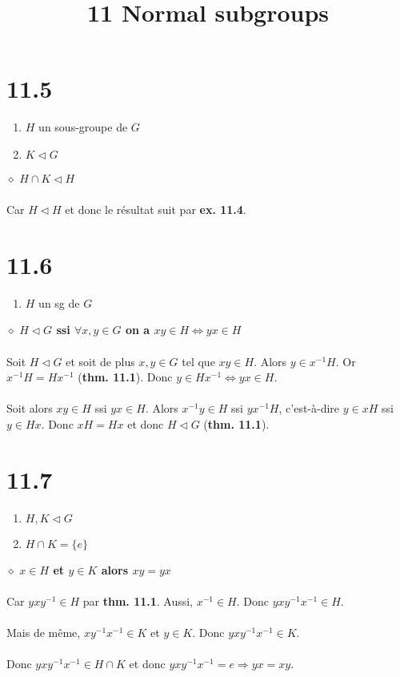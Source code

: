 \documentclass[a4paper,10pt]{article}
\title{11 Normal subgroups}
\begin{document}
\maketitle

\section*{11.5}
\begin{enumerate}
  \item $H$ un sous-groupe de $G$ 
  \item $K \triangleleft G$
\end{enumerate}
$\diamond$ $H \cap K \triangleleft H$
\\
\\
Car $H \triangleleft H$ et donc le résultat suit par \textbf{ex. 11.4}.

\section*{11.6}
\begin{enumerate}
	\item $H$ un sg de $G$
\end{enumerate}
$\diamond$ \textbf{$H \triangleleft G$ ssi $\forall x,y \in G$ on a $xy \in H \Leftrightarrow yx \in H$}
\\
\\
Soit $H \triangleleft G$ et soit de plus $x,y \in G$ tel que $xy \in H$. Alors $y \in x^{-1}H$. Or $x^{-1}H = Hx^{-1}$ (\textbf{thm. 11.1}). Donc $y \in Hx^{-1} \Leftrightarrow yx \in H$.
\\
\\
Soit alors $xy \in H$ ssi $yx \in H$. Alors $x^{-1}y \in H$ ssi $yx^{-1}H$, c'est-à-dire $y \in xH$ ssi $y \in Hx$. Donc $xH = Hx$ et donc $H \triangleleft G$ (\textbf{thm. 11.1}).

\section*{11.7}
\begin{enumerate}
	\item $H,K \triangleleft G$
	\item $H \cap K = \{e\}$
\end{enumerate}
$\diamond$ \textbf{$x \in H$ et $y \in K$ alors $xy = yx$}
\\
\\
Car $yxy^{-1} \in H$ par \textbf{thm. 11.1}. Aussi, $x^{-1} \in H$. Donc $yxy^{-1}x^{-1} \in H$. 
\\
\\
Mais de même, $xy^{-1}x^{-1} \in K$ et $y \in K$. Donc $yxy^{-1}x^{-1} \in K$. 
\\
\\
Donc $yxy^{-1}x^{-1} \in H \cap K$ et donc $yxy^{-1}x^{-1} = e \Rightarrow yx = xy$.
\end{document}
